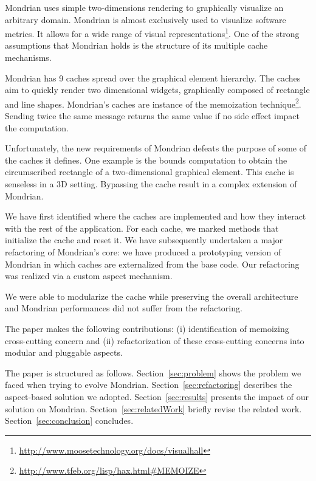 \documentclass[preprint,10pt]{sigplanconf}
\newcommand{\secref}[1]{Section~\ref{sec:#1}\xspace}
\begin{document}
Mondrian uses simple two-dimensions rendering to graphically visualize an arbitrary domain. Mondrian is almost exclusively used to visualize software metrics. It allows for a wide range of visual representations\footnote{\url{http://www.moosetechnology.org/docs/visualhall}}.
One of the strong assumptions that Mondrian holds is the structure of its multiple cache mechanisms. 

Mondrian has 9 caches spread over the graphical element hierarchy. 
The caches aim to quickly render two dimensional widgets, graphically composed of rectangle and line shapes. Mondrian's caches are instance of the memoization technique\footnote{\url{http://www.tfeb.org/lisp/hax.html\#MEMOIZE}}. Sending twice the same message returns the same value if no side effect impact the computation. 

Unfortunately, the new requirements of Mondrian defeats the purpose of some of the caches it defines. One example is the bounds computation to obtain the circumscribed rectangle of a two-dimensional graphical element. This cache is senseless in a 3D setting. Bypassing the cache result in a complex extension of Mondrian.

We have first identified where the caches are implemented and how they interact with the rest of the application.
For each cache, we marked methods that initialize the cache and reset it. 
We have subsequently undertaken a major refactoring of Mondrian's core: we have produced a prototyping version of Mondrian in which caches are externalized from the base code. Our refactoring was realized via a custom aspect mechanism.

We were able to modularize the cache while preserving the overall architecture and Mondrian performances did not suffer from the refactoring.

The paper makes the following contributions: (i) identification of memoizing cross-cutting concern and (ii) refactorization of these cross-cutting concerns into modular and pluggable aspects.

The paper is structured as follows.
\secref{problem} shows the problem we faced when trying to evolve Mondrian.
\secref{refactoring} describes the aspect-based solution we adopted.
\secref{results} presents the impact of our solution on Mondrian.
\secref{relatedWork} briefly revise the related work.
\secref{conclusion} concludes.
\end{document}
